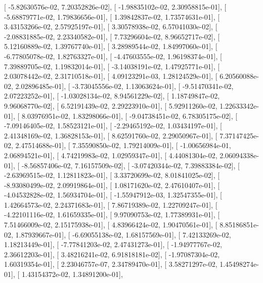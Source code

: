 \documentclass{article}
\begin{document}
       [ -5.82630576e-02,   7.20352826e-02],
       [ -1.98835102e-02,   2.30958815e-01],
       [ -5.68879771e-02,   1.79836656e-01],
       [  1.39842837e-02,   1.73574631e-01],
       [  3.43153266e-02,   2.57925197e-01],
       [  3.30578938e-02,   6.57041030e-02],
       [ -2.08831885e-02,   2.23340582e-01],
       [  7.73296604e-02,   8.96652717e-02],
       [  5.12160889e-02,   1.39767740e-01],
       [  3.28989544e-02,   1.84997060e-01],
       [ -6.77805078e-02,   1.82763327e-01],
       [ -4.47603555e-02,   1.96198374e-01],
       [  7.39889705e-02,   1.19832014e-01],
       [ -3.14038191e-02,   1.47925771e-01],
       [  2.03078442e-02,   2.31710518e-01],
       [  4.09123291e-03,   1.28124529e-01],
       [  6.20560088e-02,   2.02896485e-01],
       [ -3.73045556e-02,   1.13063624e-01],
       [ -9.51470341e-02,   2.07223252e-01],
       [ -1.03028134e-02,   8.94561229e-02],
       [  1.18749847e-02,   9.96068770e-02],
       [  6.52191439e-02,   2.29223910e-01],
       [  5.92911260e-02,   1.22633342e-01],
       [  8.03976951e-02,   1.83298066e-01],
       [ -9.04738451e-02,   6.78305175e-02],
       [ -7.09146405e-02,   1.58523121e-01],
       [ -2.29465192e-02,   1.03434197e-01],
       [  2.41348169e-02,   1.36828153e-01],
       [  8.62591760e-02,   2.29050967e-01],
       [  7.37147425e-02,   2.47514688e-01],
       [  7.35590850e-02,   1.79214009e-01],
       [ -1.00656984e-01,   2.06894521e-01],
       [  4.74219983e-02,   1.02959347e-01],
       [  4.44081304e-02,   2.06094338e-01],
       [ -8.56857406e-02,   7.16157509e-02],
       [ -3.07420344e-02,   7.39883384e-02],
       [ -2.63969515e-02,   1.12811823e-01],
       [  3.33720699e-02,   8.01841025e-02],
       [ -8.93080499e-02,   2.09919864e-01],
       [  1.08171620e-02,   2.47610407e-01],
       [ -4.04532828e-02,   1.56934704e-01],
       [ -1.55947912e-03,   1.32547355e-01],
       [  1.42664573e-02,   2.24371683e-01],
       [  7.86719389e-02,   1.22709247e-01],
       [ -4.22101116e-02,   1.61659335e-01],
       [  9.97090753e-02,   1.77389931e-01],
       [  7.51466009e-02,   2.15175938e-01],
       [  4.83966424e-02,   1.90470561e-01],
       [  8.85186851e-02,   1.87939667e-01],
       [ -6.69055138e-02,   1.68157569e-01],
       [  7.42133269e-02,   1.18213449e-01],
       [ -7.77841203e-02,   2.47431273e-01],
       [ -1.94977767e-02,   2.36612203e-01],
       [  3.48216241e-02,   6.91818181e-02],
       [ -1.97087304e-02,   1.60319354e-01],
       [  2.23046757e-07,   2.34789470e-01],
       [  3.58271297e-02,   1.45498274e-01],
       [  1.43154372e-02,   1.34891200e-01],
\end{document}
